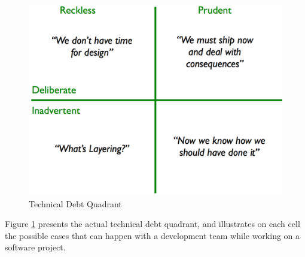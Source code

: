 
\begin{figure}[thb!]
  \centering
  \vspace{5mm}
  \includegraphics[width=1\textwidth]{figures/literature_review/technical_debt_quadrant.png}
  \caption{Technical Debt Quadrant}
  \label{fig:technical_debt_quadrant}
\end{figure}


Figure \ref{fig:technical_debt_quadrant} presents the actual technical debt quadrant, and illustrates on each cell the possible cases that can happen with a development team while working on a software project. 

 




